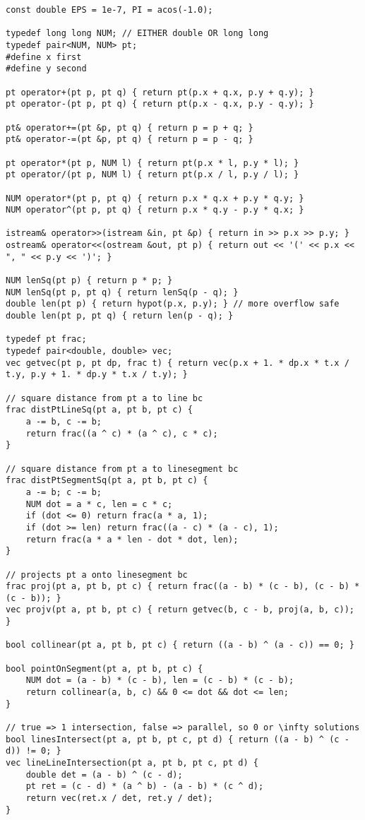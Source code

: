 \documentclass{article}
\begin{document}
\begin{lstlisting}
const double EPS = 1e-7, PI = acos(-1.0);

typedef long long NUM; // EITHER double OR long long
typedef pair<NUM, NUM> pt;
#define x first
#define y second

pt operator+(pt p, pt q) { return pt(p.x + q.x, p.y + q.y); }
pt operator-(pt p, pt q) { return pt(p.x - q.x, p.y - q.y); }

pt& operator+=(pt &p, pt q) { return p = p + q; }
pt& operator-=(pt &p, pt q) { return p = p - q; }

pt operator*(pt p, NUM l) { return pt(p.x * l, p.y * l); }
pt operator/(pt p, NUM l) { return pt(p.x / l, p.y / l); }

NUM operator*(pt p, pt q) { return p.x * q.x + p.y * q.y; }
NUM operator^(pt p, pt q) { return p.x * q.y - p.y * q.x; }

istream& operator>>(istream &in, pt &p) { return in >> p.x >> p.y; }
ostream& operator<<(ostream &out, pt p) { return out << '(' << p.x << ", " << p.y << ')'; }

NUM lenSq(pt p) { return p * p; }
NUM lenSq(pt p, pt q) { return lenSq(p - q); }
double len(pt p) { return hypot(p.x, p.y); } // more overflow safe
double len(pt p, pt q) { return len(p - q); }

typedef pt frac;
typedef pair<double, double> vec;
vec getvec(pt p, pt dp, frac t) { return vec(p.x + 1. * dp.x * t.x / t.y, p.y + 1. * dp.y * t.x / t.y); }

// square distance from pt a to line bc
frac distPtLineSq(pt a, pt b, pt c) {
	a -= b, c -= b;
	return frac((a ^ c) * (a ^ c), c * c);
}

// square distance from pt a to linesegment bc
frac distPtSegmentSq(pt a, pt b, pt c) {
	a -= b; c -= b;
	NUM dot = a * c, len = c * c;
	if (dot <= 0) return frac(a * a, 1);
	if (dot >= len) return frac((a - c) * (a - c), 1);
	return frac(a * a * len - dot * dot, len);
}

// projects pt a onto linesegment bc
frac proj(pt a, pt b, pt c) { return frac((a - b) * (c - b), (c - b) * (c - b)); }
vec projv(pt a, pt b, pt c) { return getvec(b, c - b, proj(a, b, c)); }

bool collinear(pt a, pt b, pt c) { return ((a - b) ^ (a - c)) == 0; }

bool pointOnSegment(pt a, pt b, pt c) {
	NUM dot = (a - b) * (c - b), len = (c - b) * (c - b);
	return collinear(a, b, c) && 0 <= dot && dot <= len;
}

// true => 1 intersection, false => parallel, so 0 or \infty solutions
bool linesIntersect(pt a, pt b, pt c, pt d) { return ((a - b) ^ (c - d)) != 0; }
vec lineLineIntersection(pt a, pt b, pt c, pt d) {
	double det = (a - b) ^ (c - d);
	pt ret = (c - d) * (a ^ b) - (a - b) * (c ^ d);
	return vec(ret.x / det, ret.y / det);
}


\end{lstlisting}
\end{document}
